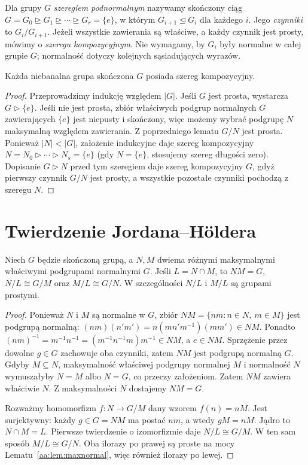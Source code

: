 \begin{definicja}
\label{aa:def:kompozycyjny}
Dla grupy $G$ \emph{szeregiem podnormalnym} nazywamy skończony ciąg
$G=G_0\trianglerighteq G_1\trianglerighteq\cdots\trianglerighteq G_r=\{e\}$,
w którym $G_{i+1}\trianglelefteq G_i$ dla każdego $i$.
Jego \emph{czynniki} to $G_i/G_{i+1}$.
Jeżeli wszystkie zawierania są właściwe, a każdy czynnik jest prosty,
mówimy o \emph{szeregu kompozycyjnym}.
Nie wymagamy, by $G_i$ były normalne w całej grupie $G$;
normalność dotyczy kolejnych sąsiadujących wyrazów.
\end{definicja}

\begin{twierdzenie}
\label{aa:tw:existcomp}
Każda niebanalna grupa skończona $G$ posiada szereg kompozycyjny.
\end{twierdzenie}
\begin{proof}
Przeprowadzimy indukcję względem $|G|$.
Jeśli $G$ jest prosta, wystarcza $G\triangleright\{e\}$.
Jeśli nie jest prosta, zbiór właściwych podgrup normalnych
$G$ zawierających $\{e\}$ jest niepusty i skończony,
więc możemy wybrać podgrupę $N$ maksymalną względem zawierania.
Z poprzedniego lematu $G/N$ jest prosta.
Ponieważ $|N|<|G|$, założenie indukcyjne daje szereg
kompozycyjny $N=N_0\triangleright\cdots\triangleright N_s=\{e\}$
(gdy $N=\{e\}$, stosujemy szereg długości zero).
Dopisanie $G\triangleright N$ przed tym szeregiem daje
szereg kompozycyjny $G$, gdyż pierwszy czynnik $G/N$ jest prosty,
a wszystkie pozostałe czynniki pochodzą z szeregu $N$.
\end{proof}

\section{Twierdzenie Jordana--Höldera}
\begin{lemat}
\label{aa:lem:two-max}
Niech $G$ będzie skończoną grupą, a $N,M$ dwiema różnymi
maksymalnymi właściwymi podgrupami normalnymi $G$.
Jeśli $L=N\cap M$, to $NM=G$,
$N/L\cong G/M$ oraz $M/L\cong G/N$.
W szczególności $N/L$ i $M/L$ są grupami prostymi.
\end{lemat}
\begin{proof}
Ponieważ $N$ i $M$ są normalne w $G$, zbiór
$NM=\{nm:n\in N,\ m\in M\}$ jest podgrupą normalną:
$(nm)(n'm')=n(mn'm^{-1})(mm')\in NM$.
Ponadto $(nm)^{-1}=m^{-1}n^{-1}
=(m^{-1}n^{-1}m)m^{-1}\in NM$, a $e\in NM$.
Sprzężenie przez dowolne $g\in G$ zachowuje oba czynniki,
zatem $NM$ jest podgrupą normalną $G$.
Gdyby $M\subseteq N$, maksymalność właściwej podgrupy normalnej
$M$ i normalność $N$ wymuszałyby $N=M$ albo $N=G$,
co przeczy założeniom. Zatem $NM$ zawiera właściwie $N$.
Z maksymalności $N$ dostajemy $NM=G$.

Rozważmy homomorfizm $f:N\to G/M$ dany wzorem $f(n)=nM$.
Jest surjektywny: każdy $g\in G=NM$ ma postać $nm$,
a wtedy $gM=nM$. Jądro to $N\cap M=L$.
Pierwsze twierdzenie o izomorfizmie daje $N/L\cong G/M$.
W ten sam sposób $M/L\cong G/N$.
Oba ilorazy po prawej są proste na mocy
Lematu~\ref{aa:lem:maxnormal}, więc również ilorazy po lewej.
\end{proof}

